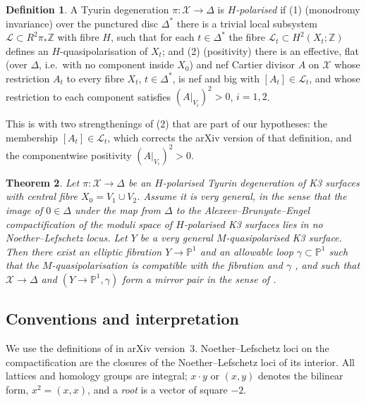 \documentclass[12pt]{article}
\newcommand{\Z}{\mathbb Z}
\newcommand{\PP}{\mathbb P}
\newcommand{\calX}{\mathcal X}
\newcommand{\calL}{\mathcal L}
\newtheorem{theorem}{Theorem}[section]
\theoremstyle{definition}
\newtheorem{definition}[theorem]{Definition}
\theoremstyle{remark}
\begin{document}
\begin{definition}\label{def:Hpol}
A Tyurin degeneration \(\pi\colon\calX\to\Delta\) is
\emph{\(H\)-polarised} if
(1) (monodromy invariance) over the punctured disc \(\Delta^*\)
there is a trivial local subsystem \(\calL\subset R^2\pi_*\Z\) with
fibre \(H\), such that for each \(t\in\Delta^*\) the fibre
\(\calL_t\subset H^2(X_t;\Z)\) defines an \(H\)-quasipolarisation of
\(X_t\); and
(2) (positivity) there is an effective, flat (over \(\Delta\), i.e.\
with no component inside \(X_0\)) and nef Cartier divisor
\(A\) on \(\calX\) whose restriction \(A_t\) to every fibre \(X_t\),
\(t\in\Delta^*\), is nef and big with \([A_t]\in\calL_t\), and whose
restriction to each component satisfies \((A|_{V_i})^2>0\),
\(i=1,2\).
\end{definition}

This is \cite[Definition~3.20]{GT} with two strengthenings of (2)
that are part of our hypotheses: the membership \([A_t]\in\calL_t\),
which corrects the arXiv version of that definition, and the
componentwise positivity \((A|_{V_i})^2>0\).

\begin{theorem}\label{thm:main}
Let \(\pi\colon\calX\to\Delta\) be an \(H\)-polarised Tyurin
degeneration of K3 surfaces with central fibre \(X_0=V_1\cup V_2\).
Assume it is very general, in the sense that the image of
\(0\in\Delta\) under the map from \(\Delta\) to the
Alexeev--Brunyate--Engel compactification \cite{ABE} of the moduli
space of \(H\)-polarised K3 surfaces lies in no Noether--Lefschetz
locus. Let \(Y\) be a very general \(M\)-quasipolarised K3 surface.
Then there exist an elliptic fibration \(Y\to\PP^1\) and an allowable
loop \(\gamma\subset\PP^1\) \cite[Definition~4.11]{GT} such that the
\(M\)-quasipolarisation is compatible with the fibration and
\(\gamma\) \cite[Definition~4.21]{GT}, and such that \(\calX\to\Delta\)
and \((Y\to\PP^1,\gamma)\) form a mirror pair in the sense of
\cite[Definition~5.1]{GT}.
\end{theorem}

\subsection{Conventions and interpretation}\label{sec:conventions}

We use the definitions of \cite{GT} in arXiv version~3.
Noether--Lefschetz loci on the compactification are the closures of
the Noether--Lefschetz loci of its interior. All lattices and homology
groups are integral; \(x\cdot y\) or \((x,y)\) denotes the bilinear
form, \(x^2=(x,x)\), and a \emph{root} is a vector of square \(-2\).
\end{document}
